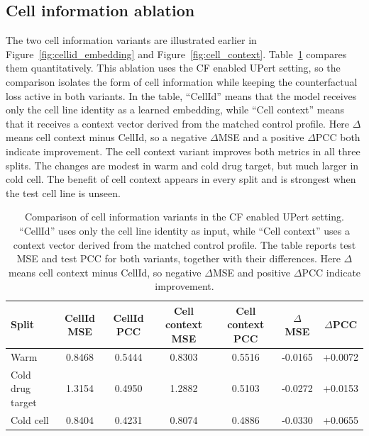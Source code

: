 \subsection{Cell information ablation}
\noindent The two cell information variants are illustrated earlier in Figure~\ref{fig:cellid_embedding} and Figure~\ref{fig:cell_context}. Table~\ref{tab:context_ablation} compares them quantitatively. This ablation uses the CF enabled UPert setting, so the comparison isolates the form of cell information while keeping the counterfactual loss active in both variants. In the table, ``CellId'' means that the model receives only the cell line identity as a learned embedding, while ``Cell context'' means that it receives a context vector derived from the matched control profile. Here $\Delta$ means cell context minus CellId, so a negative $\Delta$MSE and a positive $\Delta$PCC both indicate improvement. The cell context variant improves both metrics in all three splits. The changes are modest in warm and cold drug target, but much larger in cold cell. The benefit of cell context appears in every split and is strongest when the test cell line is unseen.

\begin{table}[htbp]
\centering
\caption[Cell Identity vs Cell Context]{Comparison of cell information variants in the CF enabled UPert setting. ``CellId'' uses only the cell line identity as input, while ``Cell context'' uses a context vector derived from the matched control profile. The table reports test MSE and test PCC for both variants, together with their differences. Here $\Delta$ means cell context minus CellId, so negative $\Delta$MSE and positive $\Delta$PCC indicate improvement.}
\label{tab:context_ablation}
\begin{tabular}{lcccccc}
\hline
Split & CellId MSE & CellId PCC & Cell context MSE & Cell context PCC & $\Delta$MSE & $\Delta$PCC \\
\hline
Warm & 0.8468 & 0.5444 & 0.8303 & 0.5516 & -0.0165 & +0.0072 \\
Cold drug target & 1.3154 & 0.4950 & 1.2882 & 0.5103 & -0.0272 & +0.0153 \\
Cold cell & 0.8404 & 0.4231 & 0.8074 & 0.4886 & -0.0330 & +0.0655 \\
\hline
\end{tabular}
\end{table}

